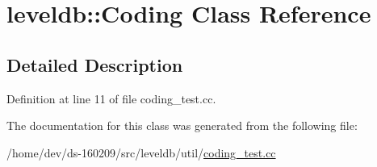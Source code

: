 \hypertarget{classleveldb_1_1_coding}{}\section{leveldb\+:\+:Coding Class Reference}
\label{classleveldb_1_1_coding}


\subsection{Detailed Description}


Definition at line 11 of file coding\+\_\+test.\+cc.



The documentation for this class was generated from the following file\+:\begin{DoxyCompactItemize}
\item 
/home/dev/ds-\/160209/src/leveldb/util/\hyperlink{coding__test_8cc}{coding\+\_\+test.\+cc}\end{DoxyCompactItemize}
